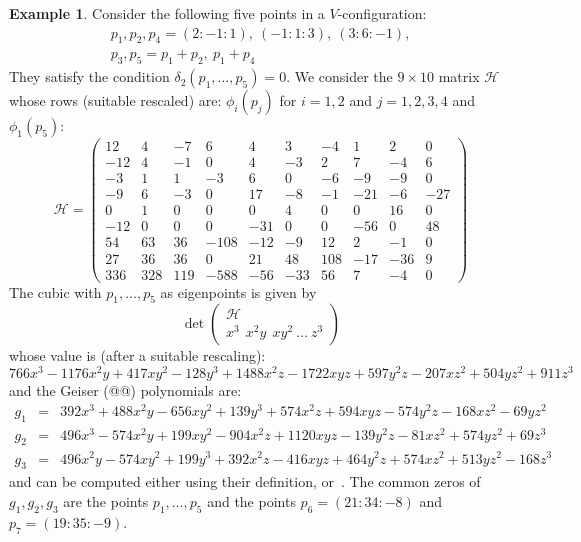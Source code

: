 \documentclass[11pt, a4paper, reqno, captions=tableheading,bibliography=totoc]{scrartcl}
\theoremstyle{plain}
\theoremstyle{definition}
\newtheorem{es}[lemma]{Example}
\begin{document}
\begin{es} Consider the following five points in a $V$-configuration:
\begin{gather*}
p_1, p_2, p_4 = (2: -1: 1), \ (-1: 1: 3), \ (3: 6: -1), \\
p_3, p_5 = p_1+p_2,  \ p_1+p_4
\end{gather*}
They satisfy the condition $\delta_2(p_1, \dots, p_5) = 0$.
We consider the $9\times 10$ matrix $\mathcal{H}$ whose rows
(suitable rescaled) are:
$\phi_i(p_j)$ for $i = 1, 2$ and $j = 1, 2, 3, 4$ and $\phi_1(p_5)$:
\[
\mathcal{H} =
\left(\begin{array}{rrrrrrrrrr}
12 & 4 & -7 & 6 & 4 & 3 & -4 & 1 & 2 & 0 \\
-12 & 4 & -1 & 0 & 4 & -3 & 2 & 7 & -4 & 6 \\
-3 & 1 & 1 & -3 & 6 & 0 & -6 & -9 & -9 & 0 \\
-9 & 6 & -3 & 0 & 17 & -8 & -1 & -21 & -6 & -27 \\
0 & 1 & 0 & 0 & 0 & 4 & 0 & 0 & 16 & 0 \\
-12 & 0 & 0 & 0 & -31 & 0 & 0 & -56 & 0 & 48 \\
54& 63& 36& -108& -12& -9& 12& 2& -1& 0\\
27 & 36 & 36 & 0 & 21 & 48 & 108 & -17 & -36 & 9 \\
336& 328& 119& -588& -56& -33& 56& 7& -4& 0
\end{array}
\right)
\]
The cubic with $p_1, \dots, p_5$ as eigenpoints is given by
\[
\det \left(
\begin{array}{c}
\mathcal{H}\\
x^3 \ \ x^2y \ \ xy^2 \ \dots \  z^3
\end{array}
\right)
\]
whose value is (after a suitable rescaling):
\[
766x^3 - 1176x^2y + 417xy^2 - 128y^3 + 1488x^2z - 1722xyz
+ 597y^2z - 207xz^2 + 504yz^2 + 911z^3
\]
and the Geiser (@@) polynomials are:
\begin{eqnarray*}
g_1 & = & 392x^3 + 488x^2y - 656xy^2 + 139y^3 + 574x^2z + 594xyz - 574y^2z - 168xz^2 - 69yz^2\\
g_2 & = & 496x^3 - 574x^2y + 199xy^2 - 904x^2z + 1120xyz - 139y^2z - 81xz^2 + 574yz^2 + 69z^3\\
g_3 & = & 496x^2y - 574xy^2 + 199y^3 + 392x^2z - 416xyz + 464y^2z + 574xz^2 + 513yz^2 - 168z^3
\end{eqnarray*}
and can be computed either using their definition,
or~.
The common zeros of $g_1, g_2, g_3$ are the points $p_1, \dots, p_5$
and the points $p_6 = (21: 34: -8)$ and $p_7 = (19: 35: -9)$.
\end{es}
\end{document}
